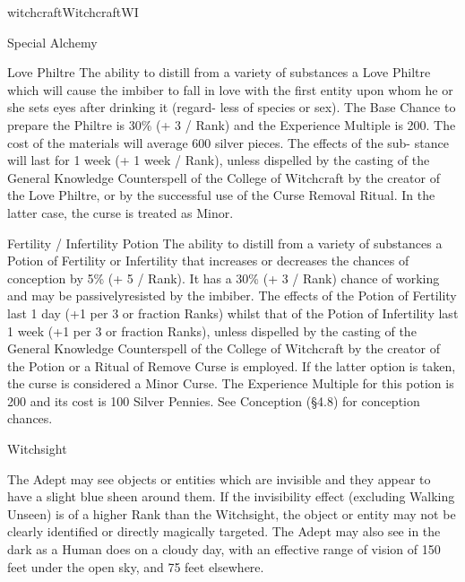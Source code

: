 \begin{College}[1.1]{witchcraft}{Witchcraft}{WI}
\begin{talent}[T-2]{Special Alchemy}
\begin{effects}
\begin{Description}
\item[Love Philtre] The ability to distill from a variety of
  substances a Love Philtre which will cause the imbiber to fall in
  love with the first entity upon whom he or she sets eyes after
  drinking it (regard- less of species or sex). The Base Chance to
  prepare the Philtre is 30\% (+ 3 / Rank) and the Experience Multiple
  is 200.  The cost of the materials will average 600 silver pieces.
  The effects of the sub- stance will last for 1 week (+ 1 week /
  Rank), unless dispelled by the casting of the General Knowledge
  Counterspell of the College of Witchcraft by the creator of the Love
  Philtre, or by the successful use of the Curse Removal Ritual. In
  the latter case, the curse is treated as Minor.

\item[Fertility / Infertility] Potion The ability to distill from a
  variety of substances a Potion of Fertility or Infertility that
  increases or decreases the chances of conception by 5\% (+ 5 /
  Rank). It has a 30\% (+ 3 / Rank) chance of working and may be
  passivelyresisted by the imbiber. The effects of the Potion of
  Fertility last 1 day (+1 per 3 or fraction Ranks) whilst that of the
  Potion of Infertility last 1 week (+1 per 3 or fraction Ranks),
  unless dispelled by the casting of the General Knowledge
  Counterspell of the College of Witchcraft by the creator of the
  Potion or a Ritual of Remove Curse is employed. If the latter option
  is taken, the curse is considered a Minor Curse.  The Experience
  Multiple for this potion is 200 and its cost is 100 Silver
  Pennies. See Conception (§4.8) for conception chances.
\end{Description}
\end{effects}
\end{talent}

\begin{talent}[T-3]{Witchsight}

\begin{effects}
The Adept may see objects or entities which are invisible and they
appear to have a slight blue sheen around them.  If the invisibility
effect (excluding Walking Unseen) is of a higher Rank than the
Witchsight, the object or entity may not be clearly identified or
directly magically targeted.  The Adept may also see in the dark as a
Human does on a cloudy day, with an effective range of vision of 150
feet under the open sky, and 75 feet elsewhere.
\end{effects}
\end{talent}


\end{College}
